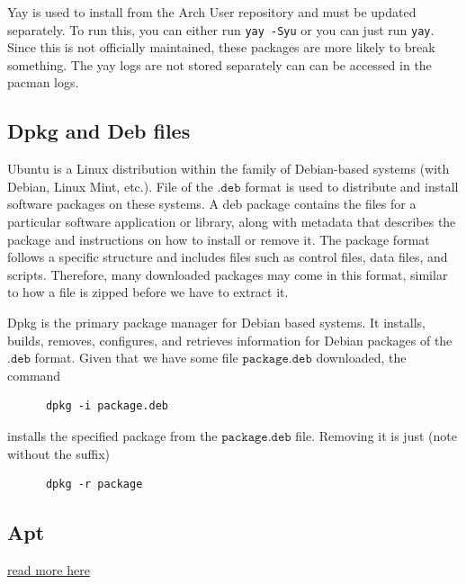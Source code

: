    Yay is used to install from the Arch User repository and must be updated separately. To run this, you can either run \texttt{yay -Syu} or you can just run \texttt{yay}. Since this is not officially maintained, these packages are more likely to break something. The yay logs are not stored separately can can be accessed in the pacman logs. 

  \subsection{Dpkg and Deb files}

    Ubuntu is a Linux distribution within the family of Debian-based systems (with Debian, Linux Mint, etc.). File of the $\texttt{.deb}$ format is used to distribute and install software packages on these systems. A deb package contains the files for a particular software application or library, along with metadata that describes the package and instructions on how to install or remove it. The package format follows a specific structure and includes files such as control files, data files, and scripts. Therefore, many downloaded packages may come in this format, similar to how a file is zipped before we have to extract it. 

    Dpkg is the primary package manager for Debian based systems. It installs, builds, removes, configures, and retrieves information for Debian packages of the $\texttt{.deb}$ format. Given that we have some file $\texttt{package.deb}$ downloaded, the command 
    \begin{lstlisting}
      dpkg -i package.deb
    \end{lstlisting}
    installs the specified package from the $\texttt{package.deb}$ file. Removing it is just (note without the suffix) 
    \begin{lstlisting}
      dpkg -r package
    \end{lstlisting}

  \subsection{Apt}

    \href{https://www.reddit.com/r/Ubuntu/comments/9awvip/eli5_snap_and_flatpak_how_are_they_differ_from_apt/}{read more here}

